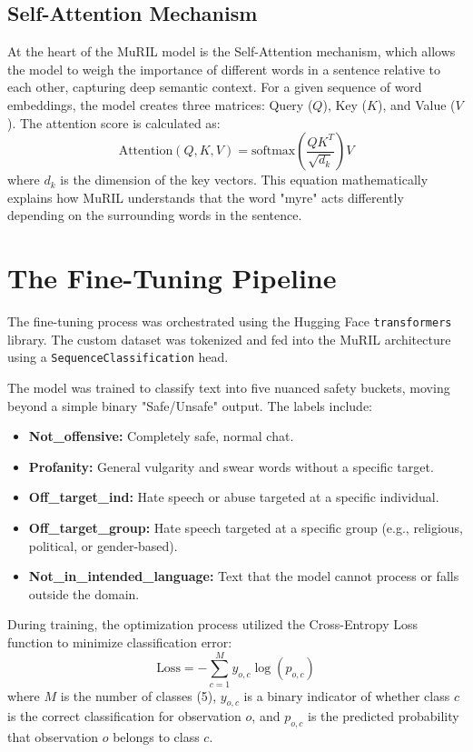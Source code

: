 \documentclass[12pt,a4paper]{report}
\begin{document}
\subsection{Self-Attention Mechanism}
At the heart of the MuRIL model is the Self-Attention mechanism, which allows the model to weigh the importance of different words in a sentence relative to each other, capturing deep semantic context. 
For a given sequence of word embeddings, the model creates three matrices: Query ($Q$), Key ($K$), and Value ($V$). The attention score is calculated as:
\begin{equation}
\text{Attention}(Q, K, V) = \text{softmax}\left(\frac{QK^T}{\sqrt{d_k}}\right)V
\end{equation}
where $d_k$ is the dimension of the key vectors. This equation mathematically explains how MuRIL understands that the word "myre" acts differently depending on the surrounding words in the sentence.

\section{The Fine-Tuning Pipeline}
The fine-tuning process was orchestrated using the Hugging Face \texttt{transformers} library. The custom dataset was tokenized and fed into the MuRIL architecture using a \texttt{SequenceClassification} head. 

The model was trained to classify text into five nuanced safety buckets, moving beyond a simple binary "Safe/Unsafe" output. The labels include:
\begin{itemize}
    \item \textbf{Not\_offensive:} Completely safe, normal chat.
    \item \textbf{Profanity:} General vulgarity and swear words without a specific target.
    \item \textbf{Off\_target\_ind:} Hate speech or abuse targeted at a specific individual.
    \item \textbf{Off\_target\_group:} Hate speech targeted at a specific group (e.g., religious, political, or gender-based).
    \item \textbf{Not\_in\_intended\_language:} Text that the model cannot process or falls outside the domain.
\end{itemize}

During training, the optimization process utilized the Cross-Entropy Loss function to minimize classification error:
\begin{equation}
\text{Loss} = -\sum_{c=1}^{M} y_{o,c} \log(p_{o,c})
\end{equation}
where $M$ is the number of classes (5), $y_{o,c}$ is a binary indicator of whether class $c$ is the correct classification for observation $o$, and $p_{o,c}$ is the predicted probability that observation $o$ belongs to class $c$. 
\end{document}
